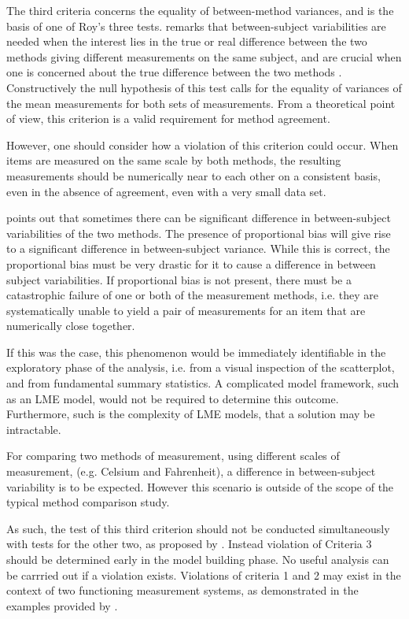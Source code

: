 \documentclass[12pt, a4paper]{report}
\theoremstyle{plain}
\theoremstyle{definition}
\theoremstyle{remark}
\begin{document}
The third criteria concerns the equality of between-method variances, and is the basis of one of Roy's three tests. \citet{ARoy2009} remarks that between-subject variabilities are needed when the interest lies in the true or real difference between the two methods giving different measurements on the same subject, and are crucial when one is concerned about the true difference between the two methods \citep{ARoy2009}. Constructively the null hypothesis of this test calls for the equality of variances of the mean measurements 
for both sets of measurements. From a theoretical point of view, this criterion is a valid requirement for method agreement. 

However, one should consider how a violation of this criterion could occur. When items are measured on the same scale by both methods, the resulting measurements should be numerically near to each other on a consistent basis, even in the absence of agreement, even with a very small data set. 

\citet{ARoy2009} points out that sometimes there can be significant difference in between-subject variabilities of the two methods. The presence of proportional bias will give rise to a significant difference in between-subject variance. While this is correct, the proportional bias must be very drastic for it to cause a difference in between subject variabilities. If proportional bias is not present, there must be a catastrophic failure of one or both of the measurement methods, i.e. they are systematically unable to yield a pair of measurements for an item that are numerically close together.

If this was the case, this phenomenon would be immediately identifiable in the exploratory phase of the analysis, i.e. from a visual inspection of the scatterplot, and from fundamental summary statistics. A complicated model framework, such as an LME model, would not be required to determine this outcome. Furthermore, such is the complexity of LME models, that a solution may be intractable.

For comparing two methods of measurement, using different scales of measurement, (e.g. Celsium and Fahrenheit), a difference in between-subject variability is to be expected. However this scenario is outside of the scope of the typical method comparison study. 

As such, the test of this third criterion should not be conducted simultaneously with tests for the other two, as proposed by \citet{ARoy2009}. Instead violation of Criteria 3 should be determined early in the model building phase. No useful analysis can be carrried out if a violation exists. Violations of criteria 1 and 2 may exist in the context of two functioning measurement systems, as demonstrated in the examples provided by \citet{ARoy2009}.
\end{document}
